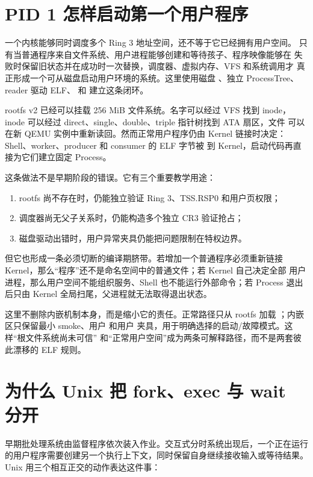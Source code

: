 \section{PID 1 怎样启动第一个用户程序}

一个内核能够同时调度多个 Ring 3 地址空间，还不等于它已经拥有用户空间。
只有当普通程序来自文件系统、用户进程能够创建和等待孩子、程序映像能够在
失败时保留旧状态并在成功时一次替换，调度器、虚拟内存、VFS 和系统调用才
真正形成一个可从磁盘启动用户环境的系统。这里使用磁盘
、独立
ProcessTree、reader 驱动 ELF、 和
 建立这条闭环。

rootfs v2 已经可以挂载 256 MiB 文件系统。名字可以经过 VFS 找到 inode，
inode 可以经过 direct、single、double、triple 指针树找到 ATA 扇区，文件
可以在新 QEMU 实例中重新读回。然而正常用户程序仍由 Kernel 链接时决定：
Shell、worker、producer 和 consumer 的 ELF 字节被  到
Kernel，启动代码再直接为它们建立固定 Process。

这条做法不是早期阶段的错误。它有三个重要教学用途：

\begin{enumerate}
  \item rootfs 尚不存在时，仍能独立验证 Ring 3、TSS.RSP0 和用户页权限；
  \item 调度器尚无父子关系时，仍能构造多个独立 CR3 验证抢占；
  \item 磁盘驱动出错时，用户异常夹具仍能把问题限制在特权边界。
\end{enumerate}

但它也形成一条必须切断的编译期脐带。若增加一个普通程序必须重新链接
Kernel，那么“程序”还不是命名空间中的普通文件；若 Kernel 自己决定全部
用户进程，那么用户空间不能组织服务、Shell 也不能运行外部命令；若 Process
退出后只由 Kernel 全局扫尾，父进程就无法取得退出状态。

这里不删除内嵌机制本身，而是缩小它的责任。正常路径只从 rootfs 加载
；内嵌区只保留最小 smoke、用户  和用户
 夹具，用于明确选择的启动/故障模式。这样“根文件系统尚未可信”
和“正常用户空间”成为两条可解释路径，而不是两套彼此漂移的 ELF 规则。

\section{为什么 Unix 把 fork、exec 与 wait 分开}
早期批处理系统由监督程序依次装入作业。交互式分时系统出现后，一个正在运行
的用户程序需要创建另一个执行上下文，同时保留自身继续接收输入或等待结果。
Unix 用三个相互正交的动作表达这件事：

